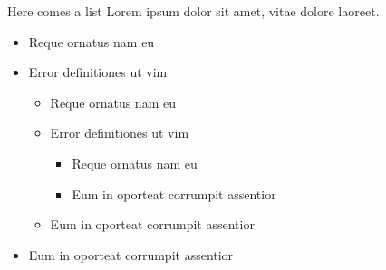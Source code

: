 \documentclass[11pt,usenames,dvipsnames]{beamer}
\begin{document}
\begin{frame}{Here comes a list}
    Lorem ipsum dolor sit amet, vitae dolore laoreet. 
    \begin{itemize}
        \item Reque ornatus nam eu
        \item Error definitiones ut vim
        \begin{itemize}
            \item Reque ornatus nam eu
            \item Error definitiones ut vim
            \begin{itemize}
                \item Reque ornatus nam eu
                \item Eum in oporteat corrumpit assentior 
            \end{itemize}
            \item Eum in oporteat corrumpit assentior 
        \end{itemize}
        \item Eum in oporteat corrumpit assentior 
    \end{itemize}
\end{frame}

\hilumithankyoupage

\end{document}
